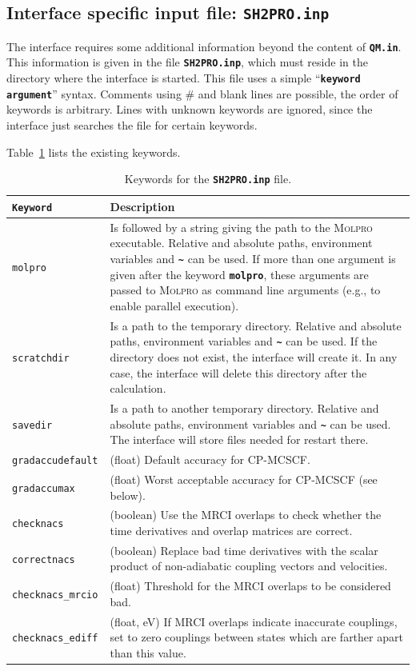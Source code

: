 \documentclass[a4paper,11pt,DIV=15,openany,twoside=false]{scrbook}
\newcommand{\ttt}[1]{\textbf{\texttt{#1}}}
\begin{document}
\subsection{Interface specific input file: \ttt{SH2PRO.inp}}

The interface requires some additional information beyond the content of \ttt{QM.in}. This information is given in the file \ttt{SH2PRO.inp}, which must reside in the directory where the interface is started. This file uses a simple ``\ttt{keyword argument}'' syntax. Comments using \# and blank lines are possible, the order of keywords is arbitrary. Lines with unknown keywords are ignored, since the interface just searches the file for certain keywords.

Table~\ref{tab:molpro_sh2} lists the existing keywords.

\begin{table}
  \centering
  \caption{Keywords for the \ttt{SH2PRO.inp} file.}
  \label{tab:molpro_sh2}
  \begin{tabular}{>{\tt}lp{12cm}}
  \toprule
  Keyword       &Description\\
  \midrule
  molpro          &Is followed by a string giving the path to the \textsc{Molpro} executable. Relative and absolute paths, environment variables and \ttt{\textasciitilde} can be used. If more than one argument is given after the keyword \ttt{molpro}, these arguments are passed to \textsc{Molpro} as command line arguments (e.g., to enable parallel execution). \\
  scratchdir      &Is a path to the temporary directory. Relative and absolute paths, environment variables and \ttt{\textasciitilde} can be used. If the directory does not exist, the interface will create it. In any case, the interface will delete this directory after the calculation.\\
  savedir         &Is a path to another temporary directory.  Relative and absolute paths, environment variables and \ttt{\textasciitilde} can be used. The interface will store files needed for restart there.\\
  gradaccudefault &(float) Default accuracy for CP-MCSCF.\\
  gradaccumax     &(float) Worst acceptable accuracy for CP-MCSCF (see below).\\
  checknacs       &(boolean) Use the MRCI overlaps to check whether the time derivatives and overlap matrices are correct.\\
  correctnacs     &(boolean) Replace bad time derivatives with the scalar product of non-adiabatic coupling vectors and velocities.\\
  checknacs\_mrcio &(float) Threshold for the MRCI overlaps to be considered bad.\\
  checknacs\_ediff &(float, eV) If MRCI overlaps indicate inaccurate couplings, set to zero couplings between states which are farther apart than this value.\\
  \bottomrule
  \end{tabular}
\end{table}
\end{document}
